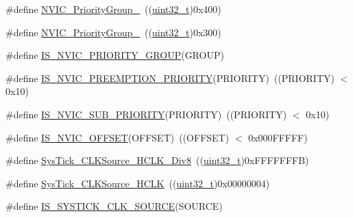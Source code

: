 \begin{DoxyCompactItemize}
\item 
\#define \hyperlink{group___preemption___priority___group_ga49bdbee77d4a70339d63c80462d49b4d}{N\+V\+I\+C\+\_\+\+Priority\+Group\+\_}~((\hyperlink{_p_e___types_8h_a33594304e786b158f3fb30289278f5af}{uint32\+\_\+t})0x400)
\item 
\#define \hyperlink{group___preemption___priority___group_gaf9020c585da2a299328f0b06dee391a2}{N\+V\+I\+C\+\_\+\+Priority\+Group\+\_}~((\hyperlink{_p_e___types_8h_a33594304e786b158f3fb30289278f5af}{uint32\+\_\+t})0x300)
\item 
\#define \hyperlink{group___preemption___priority___group_ga6569304a39fe4f91bd59b6a586c8ede9}{I\+S\+\_\+\+N\+V\+I\+C\+\_\+\+P\+R\+I\+O\+R\+I\+T\+Y\+\_\+\+G\+R\+O\+UP}(G\+R\+O\+UP)
\item 
\#define \hyperlink{group___preemption___priority___group_gaf30fd8f5960c2e28a772d8f16bb156dd}{I\+S\+\_\+\+N\+V\+I\+C\+\_\+\+P\+R\+E\+E\+M\+P\+T\+I\+O\+N\+\_\+\+P\+R\+I\+O\+R\+I\+TY}(P\+R\+I\+O\+R\+I\+TY)~((P\+R\+I\+O\+R\+I\+TY) $<$ 0x10)
\item 
\#define \hyperlink{group___preemption___priority___group_ga010705bc997dcff935b965b372cba61d}{I\+S\+\_\+\+N\+V\+I\+C\+\_\+\+S\+U\+B\+\_\+\+P\+R\+I\+O\+R\+I\+TY}(P\+R\+I\+O\+R\+I\+TY)~((P\+R\+I\+O\+R\+I\+TY) $<$ 0x10)
\item 
\#define \hyperlink{group___preemption___priority___group_ga1184bbb97d758385f98ab40dd5e5af59}{I\+S\+\_\+\+N\+V\+I\+C\+\_\+\+O\+F\+F\+S\+ET}(O\+F\+F\+S\+ET)~((O\+F\+F\+S\+ET) $<$ 0x000\+F\+F\+F\+F\+F)
\item 
\#define \hyperlink{group___sys_tick__clock__source_ga545c387ce43db90f15faad5f354f890d}{Sys\+Tick\+\_\+\+C\+L\+K\+Source\+\_\+\+H\+C\+L\+K\+\_\+\+Div8}~((\hyperlink{_p_e___types_8h_a33594304e786b158f3fb30289278f5af}{uint32\+\_\+t})0x\+F\+F\+F\+F\+F\+F\+F\+B)
\item 
\#define \hyperlink{group___sys_tick__clock__source_ga8a885ce2632ad4c35e229bb7c6e60191}{Sys\+Tick\+\_\+\+C\+L\+K\+Source\+\_\+\+H\+C\+LK}~((\hyperlink{_p_e___types_8h_a33594304e786b158f3fb30289278f5af}{uint32\+\_\+t})0x00000004)
\item 
\#define \hyperlink{group___sys_tick__clock__source_ga22d6291f6aed29442cf4cd9098fa0784}{I\+S\+\_\+\+S\+Y\+S\+T\+I\+C\+K\+\_\+\+C\+L\+K\+\_\+\+S\+O\+U\+R\+CE}(S\+O\+U\+R\+CE)
\end{DoxyCompactItemize}
